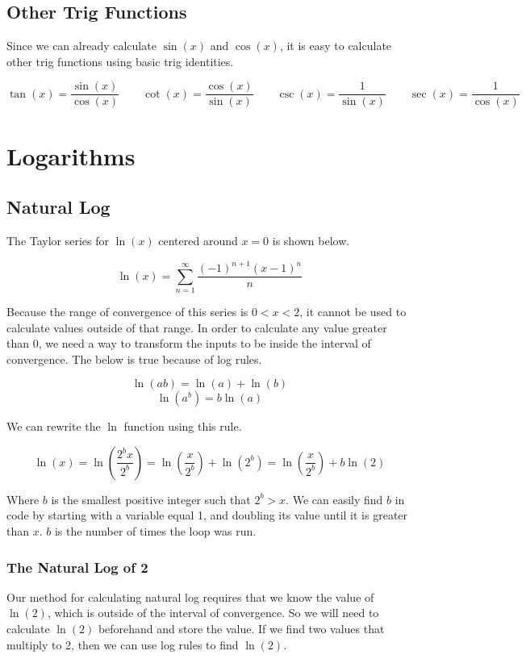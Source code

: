 \documentclass[12pt, letterpaper]{article}
\begin{document}
\subsection{Other Trig Functions}
Since we can already calculate $\sin(x)$ and $\cos(x)$, it is easy to calculate other trig functions using basic trig identities.

\[ \tan(x) = \frac{\sin(x)}{\cos(x)} \qquad \cot(x) = \frac{\cos(x)}{\sin(x)}  \qquad \csc(x) = \frac{1}{\sin(x)} \qquad \sec(x) = \frac{1}{\cos(x)}
\]

\section{Logarithms}
\subsection{Natural Log}
The Taylor series for $\ln(x)$ centered around $x=0$ is shown below.

\[ \ln(x) = \sum_{n=1}^{\infty}\frac{\left(-1\right)^{n+1}\left(x-1\right)^{n}}{n} \]

Because the range of convergence of this series is $0<x<2$, it cannot be used to calculate values outside of that range. In order to calculate any value greater than 0, we need a way to transform the inputs to be inside the interval of convergence. The below is true because of log rules.

\[ \ln(ab) = \ln(a) + \ln(b) \]
\[ \ln(a^b) = b\ln(a) \]

We can rewrite the $\ln$ function using this rule.

\[ \ln(x) = \ln\left(\frac{2^bx}{2^b}\right) = \ln\left(\frac{x}{2^b}\right) + \ln\left(2^b\right) = \ln\left(\frac{x}{2^b}\right) + b\ln\left(2\right) \]

Where $b$ is the smallest positive integer such that $2^b>x$. We can easily find $b$ in code by starting with a variable equal 1, and doubling its value until it is greater than $x$. $b$ is the number of times the loop was run.

\subsubsection{The Natural Log of 2}
Our method for calculating natural log requires that we know the value of $\ln(2)$, which is outside of the interval of convergence. So we will need to calculate $\ln(2)$ beforehand and store the value. If we find two values that multiply to 2, then we can use log rules to find $\ln(2)$.
\end{document}
